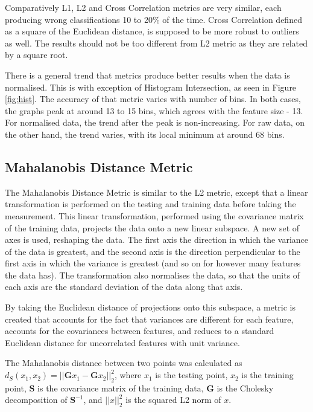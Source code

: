 \documentclass[10pt,twocolumn,letterpaper]{article}
\begin{document}
Comparatively L1, L2 and Cross Correlation metrics are very similar, each producing wrong classifications 10 to 20\% of the time. Cross Correlation defined as a square of the Euclidean distance, is supposed to be more robust to outliers as well. The results should not be too different from L2 metric as they are related by a square root. 

There is a general trend that metrics produce better results when the data is normalised. This is with exception of Histogram Intersection, as seen in Figure \ref{fig:hist}. The accuracy of that metric varies with number of bins. In both cases, the graphs peak at around 13 to 15 bins, which agrees with the feature size - 13. For normalised data, the trend after the peak is non-increasing. For raw data, on the other hand, the trend varies, with its local minimum at around 68 bins. 

\subsection{Mahalanobis Distance Metric}

The Mahalanobis Distance Metric is similar to the L2 metric, except that a linear transformation is performed on the testing and training data before taking the measurement. This linear transformation, performed using the covariance matrix of the training data, projects the data onto a new linear subspace. A new set of axes is used, reshaping the data. The first axis the direction in which the variance of the data is greatest, and the second axis is the direction perpendicular to the first axis in which the variance is greatest (and so on for however many features the data has). The transformation also normalises the data, so that the units of each axis are the standard deviation of the data along that axis. 

By taking the Euclidean distance of projections onto this subspace, a metric is created that accounts for the fact that variances are different for each feature, accounts for the covariances between features, and reduces to a standard Euclidean distance for uncorrelated features with unit variance.

The Mahalanobis distance between two points was calculated as $d_S(x_1,x_2) = ||\mathbf{G}x_1 - \mathbf{G}x_2||^2_2$, where $x_1$ is the testing point, $x_2$ is the training point, $\mathbf{S}$ is the covariance matrix of the training data, $\mathbf{G}$ is the Cholesky decomposition of $\mathbf{S}^{-1}$, and $||x||^2_2$ is the squared L2 norm of $x$.
\end{document}
